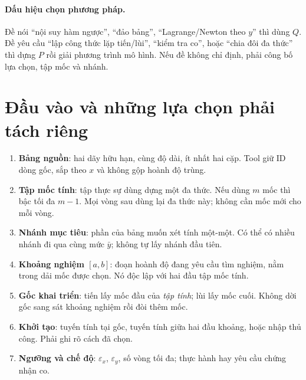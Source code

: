 \paragraph{Dấu hiệu chọn phương pháp.} Đề nói ``nội suy hàm ngược'', ``đảo bảng'', ``Lagrange/Newton theo $y$'' thì dùng $Q$. Đề yêu cầu ``lập công thức lặp tiến/lùi'', ``kiểm tra co'', hoặc ``chia đôi đa thức'' thì dựng $P$ rồi giải phương trình mô hình. Nếu đề không chỉ định, phải công bố lựa chọn, tập mốc và nhánh.

\section{Đầu vào và những lựa chọn phải tách riêng}
\label{sec:inverse-input}
\begin{enumerate}
\item \textbf{Bảng nguồn}: hai dãy hữu hạn, cùng độ dài, ít nhất hai cặp. Tool giữ ID dòng gốc, sắp theo $x$ và không gộp hoành độ trùng.
\item \textbf{Tập mốc tính}: tập thực sự dùng dựng một đa thức. Nếu dùng $m$ mốc thì bậc tối đa $m-1$. Mọi vòng sau dùng lại đa thức này; không cần mốc mới cho mỗi vòng.
\item \textbf{Nhánh mục tiêu}: phần của bảng muốn xét tính một-một. Có thể có nhiều nhánh đi qua cùng mức $\bar y$; không tự lấy nhánh đầu tiên.
\item \textbf{Khoảng nghiệm $[a,b]$}: đoạn hoành độ đang yêu cầu tìm nghiệm, nằm trong dải mốc được chọn. Nó độc lập với hai đầu tập mốc tính.
\item \textbf{Gốc khai triển}: tiến lấy mốc đầu của \emph{tập tính}; lùi lấy mốc cuối. Không dời gốc sang sát khoảng nghiệm rồi đòi thêm mốc.
\item \textbf{Khởi tạo}: tuyến tính tại gốc, tuyến tính giữa hai đầu khoảng, hoặc nhập thủ công. Phải ghi rõ cách đã chọn.
\item \textbf{Ngưỡng và chế độ}: $\varepsilon_x$, $\varepsilon_y$, số vòng tối đa; thực hành hay yêu cầu chứng nhận co.
\end{enumerate}

